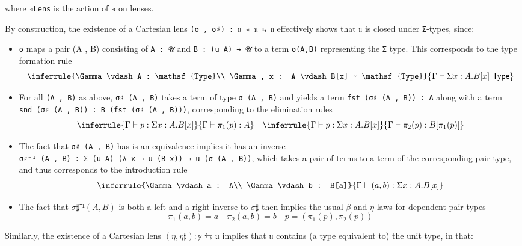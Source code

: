 \documentclass[
  11pt,
  oneside,
  article]{memoir}
\providecommand{\tightlist}{%
  \setlength{\itemsep}{0pt}\setlength{\parskip}{0pt}}
\theoremstyle{definition}
\theoremstyle{plain}
\newcommand{\0}{\textsf{0}}
\newcommand{\1}{\tn{\textsf{1}}}
\begin{document}
where \texttt{◃Lens} is the action of \texttt{◃} on lenses.

By construction, the existence of a Cartesian lens
\texttt{(σ\ ,\ σ♯)\ :\ 𝔲\ ◃\ 𝔲\ ⇆\ 𝔲} effectively shows that \texttt{𝔲}
is closed under \texttt{Σ}-types, since:

\begin{itemize}
\tightlist
\item
  \texttt{σ} maps a pair (A , B) consisting of \texttt{A\ :\ 𝓤} and
  \texttt{B\ :\ (u\ A)\ →\ 𝓤} to a term \texttt{σ(A,B)} representing the
  \texttt{Σ} type. This corresponds to the type formation rule
  \[ \inferrule{\Gamma \vdash A : \mathsf{Type}\\ \Gamma, x : A \vdash B[x] ~ \mathsf{Type}}{\Gamma \vdash \Sigma x : A . B[x] ~ \mathsf{Type}} \]
\item
  For all \texttt{(A\ ,\ B)} as above, \texttt{σ♯\ (A\ ,\ B)} takes a
  term of type \texttt{σ\ (A\ ,\ B)} and yields a term
  \texttt{fst\ (σ♯\ (A\ ,\ B))\ :\ A} along with a term
  \texttt{snd\ (σ♯\ (A\ ,\ B))\ :\ B\ (fst\ (σ♯\ (A\ ,\ B)))},
  corresponding to the elimination rules \[
  \inferrule{\Gamma \vdash p : \Sigma x : A . B[x]}{\Gamma \vdash \pi_1(p) : A} \quad \inferrule{\Gamma \vdash p : \Sigma x : A . B[x]}{\Gamma \vdash \pi_2(p) : B[\pi_1(p)]} \]
\item
  The fact that \texttt{σ♯\ (A\ ,\ B)} has is an equivalence implies it
  has an inverse
  \texttt{σ♯⁻¹\ (A\ ,\ B)\ :\ Σ\ (u\ A)\ (λ\ x\ →\ u\ (B\ x))\ →\ u\ (σ\ (A\ ,\ B))},
  which takes a pair of terms to a term of the corresponding pair type,
  and thus corresponds to the introduction rule
  \[ \inferrule{\Gamma \vdash a : A\\ \Gamma \vdash b : B[a]}{\Gamma \vdash (a , b) : \Sigma x : A . B[x]} \]
\item
  The fact that \(σ♯⁻¹ (A , B)\) is both a left and a right inverse to
  \(σ♯\) then implies the usual \(β\) and \(η\) laws for dependent pair
  types
  \[ \pi_1(a , b) = a \quad \pi_2(a , b) = b \quad p = (\pi_1(p) , \pi_2(p)) \]
\end{itemize}

Similarly, the existence of a Cartesian lens \((η , η♯) : 𝕪 ⇆ 𝔲\)
implies that \(𝔲\) contains (a type equivalent to) the unit type, in
that:
\end{document}
